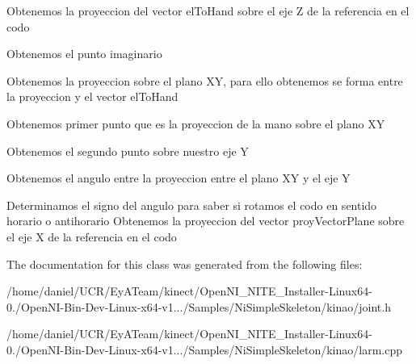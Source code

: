 Obtenemos la proyeccion del vector el\-To\-Hand sobre el eje Z de la referencia en el codo

Obtenemos el punto imaginario

Obtenemos la proyeccion sobre el plano X\-Y, para ello obtenemos se forma entre la proyeccion y el vector el\-To\-Hand

Obtenemos primer punto que es la proyeccion de la mano sobre el plano X\-Y

Obtenemos el segundo punto sobre nuestro eje Y

Obtenemos el angulo entre la proyeccion entre el plano X\-Y y el eje Y

Determinamos el signo del angulo para saber si rotamos el codo en sentido horario o antihorario Obtenemos la proyeccion del vector proy\-Vector\-Plane sobre el eje X de la referencia en el codo 

The documentation for this class was generated from the following files\-:\begin{DoxyCompactItemize}
\item 
/home/daniel/\-U\-C\-R/\-Ey\-A\-Team/kinect/\-Open\-N\-I\-\_\-\-N\-I\-T\-E\-\_\-\-Installer-\/\-Linux64-\/0./\-Open\-N\-I-\/\-Bin-\/\-Dev-\/\-Linux-\/x64-\/v1.../\-Samples/\-Ni\-Simple\-Skeleton/kinao/joint.\-h\item 
/home/daniel/\-U\-C\-R/\-Ey\-A\-Team/kinect/\-Open\-N\-I\-\_\-\-N\-I\-T\-E\-\_\-\-Installer-\/\-Linux64-\/0./\-Open\-N\-I-\/\-Bin-\/\-Dev-\/\-Linux-\/x64-\/v1.../\-Samples/\-Ni\-Simple\-Skeleton/kinao/larm.\-cpp\end{DoxyCompactItemize}
